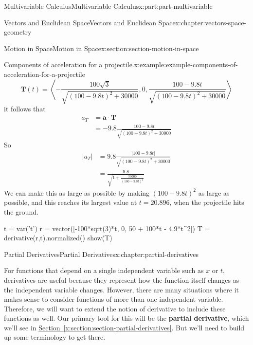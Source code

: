 \documentclass[twoside,10pt,]{book}
\newcommand{\xreffont}{\relax}
\newcommand{\terminology}[1]{\textbf{#1}}
\numberwithin{equation}{part}
\newcommand{\dotprod}[1]{\left\langle #1 \right\rangle}
\begin{document}
\begin{partptx}{Multivariable Calculus}{}{Multivariable Calculus}{}{}{x:part:part-multivariable}
\begin{chapterptx}{Vectors and Euclidean Space}{}{Vectors and Euclidean Space}{}{}{x:chapter:vectors-space-geometry}
\begin{sectionptx}{Motion in Space}{}{Motion in Space}{}{}{x:section:section-motion-in-space}
\begin{example}{Components of acceleration for a projectile.}{x:example:example-components-of-acceleration-for-a-projectile}
%
\begin{equation*}
\mathbf{T}(t) = \dotprod{-\frac{100\sqrt{3}}{\sqrt{(100-9.8t)^{2}+30000}}, 0, \frac{100 - 9.8t}{\sqrt{(100-9.8t)^{2}+30000}}}
\end{equation*}
it follows that%
%
\begin{align*}
a_{T} & = \mathbf{a}\cdot\mathbf{T} \\
& =  -9.8\frac{100 - 9.8t}{\sqrt{(100-9.8t)^{2}+30000}}
\end{align*}
So%
%
\begin{align*}
|a_{T}| & = 9.8\frac{|100 - 9.8t|}{\sqrt{(100-9.8t)^{2}+30000}} \\
& = \frac{9.8}{\sqrt{1+\frac{30000}{(100-9.8t)^{2}}}} 
\end{align*}
We can make this as large as possible by making \((100-9.8t)^{2}\) as large as possible, and this reaches its largest value at \(t = 20.896\), when the projectile hits the ground.%
\end{example}
\begin{sageinput}
t = var('t')
r = vector([-100*sqrt(3)*t, 0, 50 + 100*t - 4.9*t^2])
T = derivative(r,t).normalized()
show(T)
\end{sageinput}
\end{sectionptx}
\end{chapterptx}
%
\typeout{************************************************}
\typeout{************************************************}
%
\begin{chapterptx}{Partial Derivatives}{}{Partial Derivatives}{}{}{x:chapter:partial-derivatives}
\begin{introduction}{}%
For functions that depend on a single independent variable such as \(x\) or \(t\), derivatives are useful because they represent how the function itself changes as the independent variable changes. However, there are many situations where it makes sense to consider functions of more than one independent variable. Therefore, we will want to extend the notion of derivative to include these functions as well. Our primary tool for this will be the \terminology{partial derivative}, which we'll see in \hyperref[x:section:section-partial-derivatives]{Section~{\xreffont\ref{x:section:section-partial-derivatives}}}. But we'll need to build up some terminology to get there.%
\end{introduction}%
%
%
\typeout{************************************************}
\typeout{************************************************}

\end{chapterptx}
\end{partptx}
\end{document}
